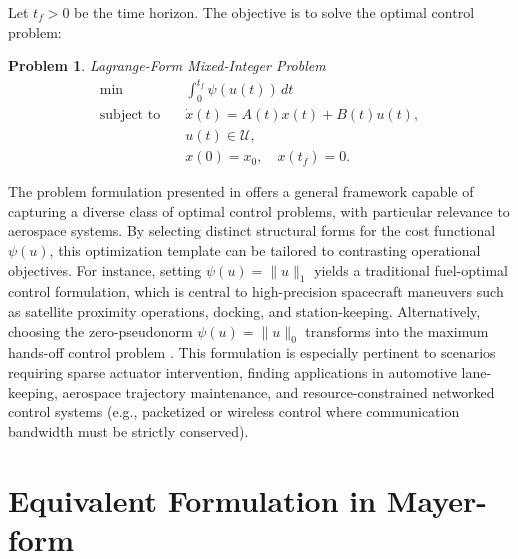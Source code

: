 \documentclass[conf]{new-aiaa}
\newtheorem{problem}{Problem}
\begin{document}
Let $t_f>0$ be the time horizon. The objective is to solve the optimal control problem:
%
\begin{problem}\rm{Lagrange-Form Mixed-Integer Problem}\label{prob:MICP}
    \begin{subequations}
        \begin{align}
            \min \quad & \int_{0}^{t_f} \psi(u(t)) \, dt \label{eq:cost} \\
            \text{subject to} \quad 
            & \dot{x}(t) = A(t) x(t) + B(t) u(t),\\
            & u(t) \in \mathcal{U}, \label{eq:input_constraints} \\
            & x(0) = x_0, \quad x(t_f) = 0. \label{eq:boundary_conditions}
        \end{align}
    \end{subequations}
\end{problem}

The problem formulation presented in  offers a general framework capable of capturing a diverse class of optimal control problems, with particular relevance to aerospace systems. By selecting distinct structural forms for the cost functional $\psi(u)$, this optimization template can be tailored to contrasting operational objectives. For instance, setting $\psi(u) = \|u\|_1$ yields a traditional fuel-optimal control formulation, which is central to high-precision spacecraft maneuvers such as satellite proximity operations, docking, and station-keeping. Alternatively, choosing the zero-pseudonorm $\psi(u) = \|u\|_0$ transforms  into the maximum hands-off control problem \cite{nagahara_maximum_2016}. This formulation is especially pertinent to scenarios requiring sparse actuator intervention, finding applications in automotive lane-keeping, aerospace trajectory maintenance, and resource-constrained networked control systems (e.g., packetized or wireless control where communication bandwidth must be strictly conserved).

\section{Equivalent Formulation in Mayer-form}\label{sec:EquivFormulation}
\end{document}
